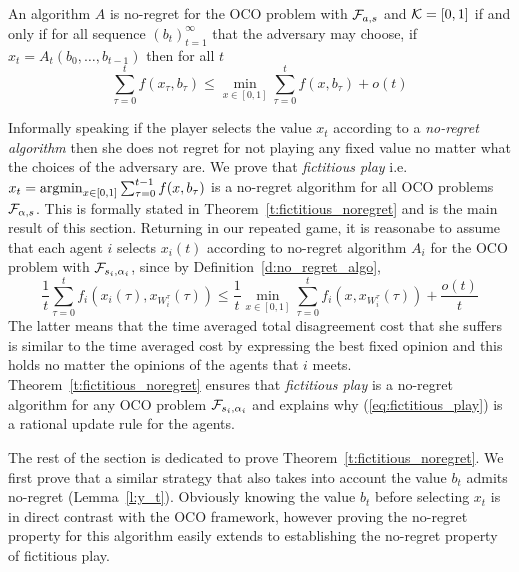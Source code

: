 \begin{definition}\label{d:no_regret_algo}
An algorithm $A$ is no-regret for the OCO problem with $\mathcal{F}_{a,s}$ and
$\mathcal{K}=[0,1]$ if and only if for all sequence $(b_t)_{t=1}^\infty$ that the
adversary may choose, if $x_t = A_t(b_0,\dots,b_{t-1})$ then for all $t$
\[\sum_{\tau=0}^t f(x_\tau,b_\tau)  \leq \min_{x \in [0,1]}\sum_{\tau=0}^t f(x,b_\tau) + o(t) \]
\end{definition}
Informally speaking if the player selects the value 
$x_t$ according to a \emph{no-regret algorithm} then
she does not regret for not playing any fixed value no
matter what the choices of the adversary are.
We prove that \emph{fictitious play} i.e. 
$x_t = \operatorname*{argmin}_{x \in [0,1]}\sum_{\tau=0}^{t-1}f(x,b_\tau)$
is a no-regret algorithm for all OCO problems $\mathcal{F}_{\alpha,s}$.
This is formally stated in Theorem~\ref{t:fictitious_noregret} 
and is the main result of this section.
Returning in our repeated game, it is reasonabe to 
assume that each agent $i$ selects $x_i(t)$ according
to no-regret algorithm $A_i$ for the OCO problem with $\mathcal{F}_{s_i,\alpha_i}$,
since by Definition~\ref{d:no_regret_algo},
\[\frac{1}{t}\sum_{\tau=0}^t f_i(x_i(\tau),x_{W_i^\tau}(\tau)) \leq
\frac{1}{t}\min_{x \in [0,1]}\sum_{\tau=0}^tf_i(x,x_{W_i^\tau}(\tau)) + \frac{o(t)}{t}\]
The latter means that the time averaged total disagreement cost
that she suffers is similar to the time averaged cost by expressing the 
best fixed opinion and this holds no matter the opinions of the
agents that $i$ meets. Theorem~\ref{t:fictitious_noregret}
ensures that \emph{fictitious play} is a no-regret algorithm 
for any OCO problem $\mathcal{F}_{s_i,\alpha_i}$ and explains why 
(\ref{eq:fictitious_play}) is a rational update rule for the agents. 

The rest of the section is dedicated to prove Theorem~\ref{t:fictitious_noregret}. 
We first prove that a similar strategy that also takes into
account the value $b_t$ admits no-regret (Lemma~\ref{l:y_t}). 
Obviously knowing the value $b_t$ before selecting $x_t$ 
is in direct contrast with the OCO framework, however proving 
the no-regret property for this algorithm easily extends to 
establishing the no-regret property of fictitious play.

